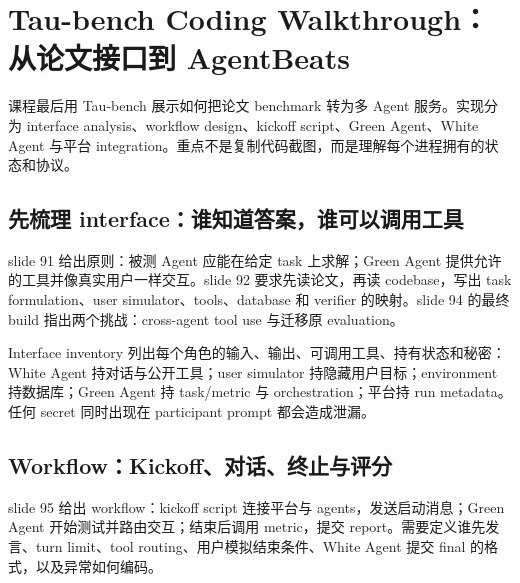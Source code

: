 \section{Tau-bench Coding Walkthrough：从论文接口到 AgentBeats}

课程最后用 Tau-bench 展示如何把论文 benchmark 转为多 Agent 服务。实现分为 interface analysis、workflow design、kickoff script、Green Agent、White Agent 与平台 integration。重点不是复制代码截图，而是理解每个进程拥有的状态和协议。

\subsection{先梳理 interface：谁知道答案，谁可以调用工具}

slide 91 给出原则：被测 Agent 应能在给定 task 上求解；Green Agent 提供允许的工具并像真实用户一样交互。slide 92 要求先读论文，再读 codebase，写出 task formulation、user simulator、tools、database 和 verifier 的映射。slide 94 的最终 build 指出两个挑战：cross-agent tool use 与迁移原 evaluation。


\begin{importantbox}{Interface inventory}
列出每个角色的输入、输出、可调用工具、持有状态和秘密：White Agent 持对话与公开工具；user simulator 持隐藏用户目标；environment 持数据库；Green Agent 持 task/metric 与 orchestration；平台持 run metadata。任何 secret 同时出现在 participant prompt 都会造成泄漏。
\end{importantbox}

\subsection{Workflow：Kickoff、对话、终止与评分}

slide 95 给出 workflow：kickoff script 连接平台与 agents，发送启动消息；Green Agent 开始测试并路由交互；结束后调用 metric，提交 report。需要定义谁先发言、turn limit、tool routing、用户模拟结束条件、White Agent 提交 final 的格式，以及异常如何编码。


